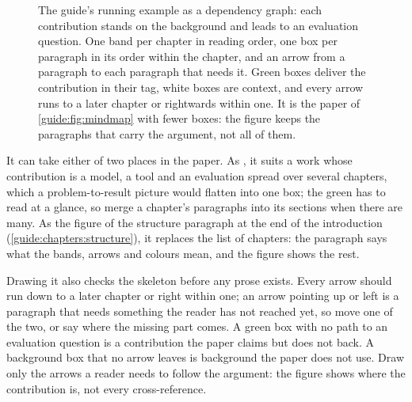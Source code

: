 \begin{figure}[!ht]
  \caption{The guide's running example as a dependency graph: each contribution stands on the background and leads to an evaluation question. One band per chapter in reading order, one box per paragraph in its order within the chapter, and an arrow from a paragraph to each paragraph that needs it. Green boxes deliver the contribution in their tag, white boxes are context, and every arrow runs to a later chapter or rightwards within one. It is the paper of \cref{guide:fig:mindmap} with fewer boxes: the figure keeps the paragraphs that carry the argument, not all of them.}\label{guide:fig:depgraph}
\end{figure}

It can take either of two places in the paper. As , it suits a work whose contribution is a model, a tool and an evaluation spread over several chapters, which a problem-to-result picture would flatten into one box; the green has to read at a glance, so merge a chapter's paragraphs into its sections when there are many. As the figure of the structure paragraph at the end of the introduction (\cref{guide:chapters:structure}), it replaces the list of chapters: the paragraph says what the bands, arrows and colours mean, and the figure shows the rest.

Drawing it also checks the skeleton before any prose exists. Every arrow should run down to a later chapter or right within one; an arrow pointing up or left is a paragraph that needs something the reader has not reached yet, so move one of the two, or say where the missing part comes. A green box with no path to an evaluation question is a contribution the paper claims but does not back. A background box that no arrow leaves is background the paper does not use. Draw only the arrows a reader needs to follow the argument: the figure shows where the contribution is, not every cross-reference.

